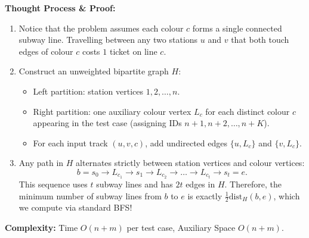 \documentclass[11pt]{article}
\begin{document}
\textbf{Thought Process \& Proof:}
\begin{enumerate}
    \item Notice that the problem assumes each colour $c$ forms a single connected subway line. Travelling between any two stations $u$ and $v$ that both touch edges of colour $c$ costs $1$ ticket on line $c$.
    \item Construct an unweighted bipartite graph $H$:
    \begin{itemize}
        \item Left partition: station vertices $1, 2, \dots, n$.
        \item Right partition: one auxiliary colour vertex $L_c$ for each distinct colour $c$ appearing in the test case (assigning IDs $n + 1, n + 2, \dots, n + K$).
        \item For each input track $(u, v, c)$, add undirected edges $\{u, L_c\}$ and $\{v, L_c\}$.
    \end{itemize}
    \item Any path in $H$ alternates strictly between station vertices and colour vertices:
    \[ b = s_0 \to L_{c_1} \to s_1 \to L_{c_2} \to \dots \to L_{c_t} \to s_t = e. \]
    This sequence uses $t$ subway lines and has $2t$ edges in $H$. Therefore, the minimum number of subway lines from $b$ to $e$ is exactly $\frac{1}{2}\text{dist}_H(b, e)$, which we compute via standard BFS!
\end{enumerate}

\textbf{Complexity:} Time $O(n + m)$ per test case, Auxiliary Space $O(n + m)$.
\end{document}
